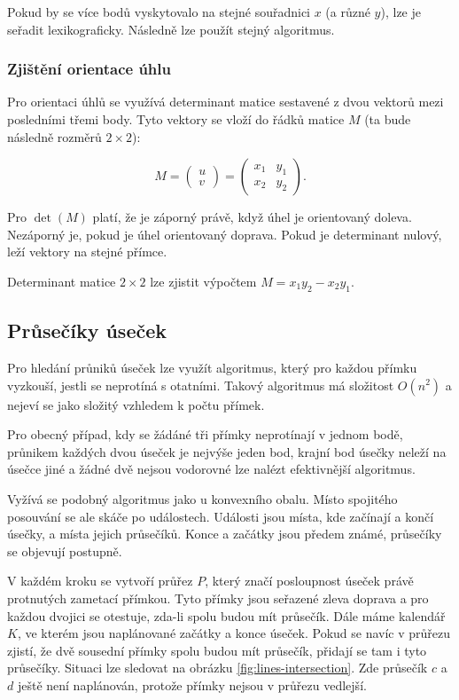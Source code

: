 Pokud by se více bodů vyskytovalo na stejné souřadnici $x$ (a různé $y$), lze je seřadit lexikograficky.
Následně lze použít stejný algoritmus.

\subsubsection{Zjištění orientace úhlu}

Pro orientaci úhlů se využívá determinant matice sestavené z dvou vektorů mezi posledními třemi body.
Tyto vektory se vloží do řádků matice $M$ (ta bude následně rozměrů $2 \times 2$):

\[
    M
    =
    \begin{pmatrix} u \\ v \end{pmatrix}
    =
    \begin{pmatrix}
     x_1 & y_1 \\
     x_2 & y_2
    \end{pmatrix}.
\]

Pro $\det (M)$ platí, že je záporný právě, když úhel je orientovaný doleva.
Nezáporný je, pokud je úhel orientovaný doprava.
Pokud je determinant nulový, leží vektory na stejné přímce.

Determinant matice $2 \times 2$ lze zjistit výpočtem $M = x_1y_2 - x_2y_1$.

\subsection{Průsečíky úseček}

Pro hledání průniků úseček lze využít algoritmus, který pro každou přímku vyzkouší, jestli se neprotíná s otatními.
Takový algoritmus má složitost $O(n^2)$ a nejeví se jako složitý vzhledem k počtu přímek.

Pro obecný případ, kdy se žádáné tři přímky neprotínají v jednom bodě, průnikem každých dvou úseček je nejvýše jeden bod, krajní bod úsečky neleží na úsečce jiné a žádné dvě nejsou vodorovné lze nalézt efektivnější algoritmus.

Vyžívá se podobný algoritmus jako u konvexního obalu.
Místo spojitého posouvání se ale skáče po událostech.
Události jsou místa, kde začínají a končí úsečky, a místa jejich průsečíků.
Konce a začátky jsou předem známé, průsečíky se objevují postupně.

V každém kroku se vytvoří průřez $P$, který značí posloupnost úseček právě protnutých zametací přímkou.
Tyto přímky jsou seřazené zleva doprava a pro každou dvojici se otestuje, zda-li spolu budou mít průsečík.
Dále máme kalendář $K$, ve kterém jsou naplánované začátky a konce úseček.
Pokud se navíc v průřezu zjistí, že dvě sousední přímky spolu budou mít průsečík, přidají se tam i tyto průsečíky.
Situaci lze sledovat na obrázku \ref{fig:lines-intersection}.
Zde průsečík $c$ a $d$ ještě není naplánován, protože přímky nejsou v průřezu vedlejší.

